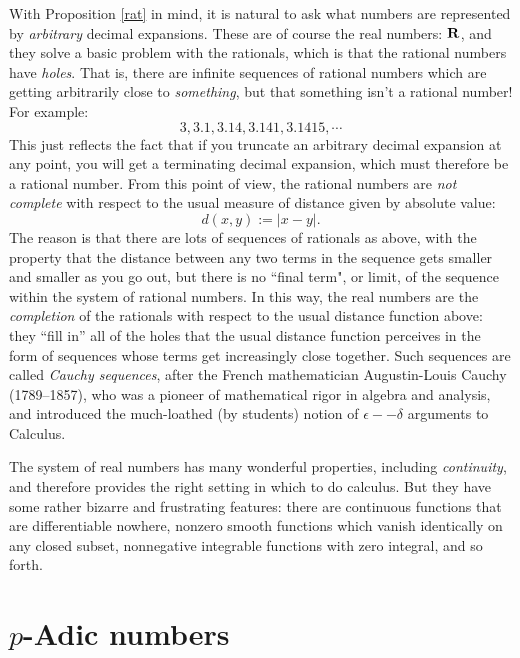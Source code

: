 \documentclass[11pt,oneside]{amsart}
\begin{document}
With Proposition \ref{rat} in mind, it is natural to ask what numbers are represented by {\em arbitrary} decimal expansions.
These are of course the real numbers: $\mathbf{R}$, and they solve a basic problem with the rationals, which is that the rational numbers have {\em holes}.
That is, there are infinite sequences of rational numbers which are getting arbitrarily close to {\em something}, but that something isn't a rational number!
For example:
$$
	3, 3.1, 3.14, 3.141, 3.1415, \cdots
$$
This just reflects the fact that if you truncate an arbitrary decimal expansion at any point, you will get a terminating decimal expansion, 
which must therefore be a rational number.  
From this point of view, the rational numbers are {\em not complete} with respect to the usual measure of distance given by absolute value:
$$
	d(x,y) := |x - y|.
$$
The reason is that there are lots of sequences of rationals as above, with the property that the distance between any two terms
in the sequence gets smaller and smaller as you go out, but there is no ``final term", or limit, of the sequence within the system of 
rational numbers.  In this way, the real numbers are the {\em completion} of the rationals with respect to the usual distance function above:
they ``fill in'' all of the holes that the usual distance function perceives in the form of sequences whose terms get increasingly close together.
Such sequences are called {\em Cauchy sequences}, after the French mathematician Augustin-Louis Cauchy (1789--1857), who
was a pioneer of mathematical rigor in algebra and analysis, and introduced the much-loathed (by students) notion of $\epsilon--\delta$
arguments to Calculus.

The system of real numbers has many wonderful properties, including {\em continuity}, and therefore provides the right setting
in which to do calculus.  But they have some rather bizarre and frustrating features: there are continuous functions that are differentiable 
nowhere, nonzero smooth functions which vanish identically on any closed subset, nonnegative integrable functions with zero integral, and so forth.


\section{$p$-Adic numbers}
\end{document}
